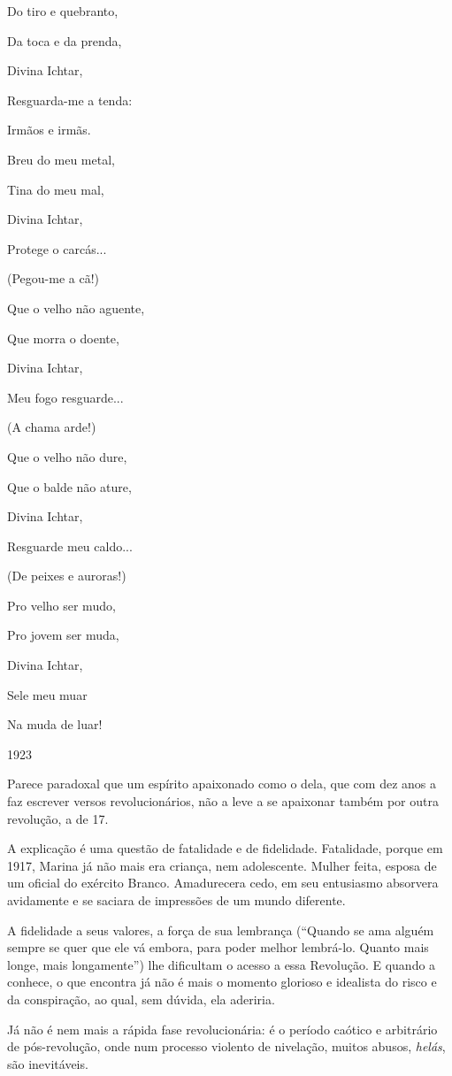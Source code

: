 Do tiro e quebranto,

Da toca e da prenda,

Divina Ichtar,

Resguarda-me a tenda:

Irmãos e irmãs.

Breu do meu metal,

Tina do meu mal,

Divina Ichtar,

Protege o carcás...

(Pegou-me a cã!)

Que o velho não aguente,

Que morra o doente,

Divina Ichtar,

Meu fogo resguarde...

(A chama arde!)

Que o velho não dure,

Que o balde não ature,

Divina Ichtar,

Resguarde meu caldo...

(De peixes e auroras!)

Pro velho ser mudo,

Pro jovem ser muda,

Divina Ichtar,

Sele meu muar

Na muda de luar!

1923

Parece paradoxal que um espírito apaixonado como o dela, que com dez
anos a faz escrever versos revolucionários, não a leve a se apaixonar
também por outra revolução, a de 17.

A explicação é uma questão de fatalidade e de fidelidade. Fatalidade,
porque em 1917, Marina já não mais era criança, nem adolescente. Mulher
feita, esposa de um oficial do exército Branco. Amadurecera cedo, em seu
entusiasmo absorvera avidamente e se saciara de impressões de um mundo
diferente.

A fidelidade a seus valores, a força de sua lembrança (``Quando se ama
alguém sempre se quer que ele vá embora, para poder melhor lembrá-lo.
Quanto mais longe, mais longamente'') lhe dificultam o acesso a essa
Revolução. E quando a conhece, o que encontra já não é mais o momento
glorioso e idealista do risco e da conspiração, ao qual, sem dúvida, ela
aderiria.

Já não é nem mais a rápida fase revolucionária: é o período caótico e
arbitrário de pós-revolução, onde num processo violento de nivelação,
muitos abusos, \emph{helás}, são inevitáveis.

